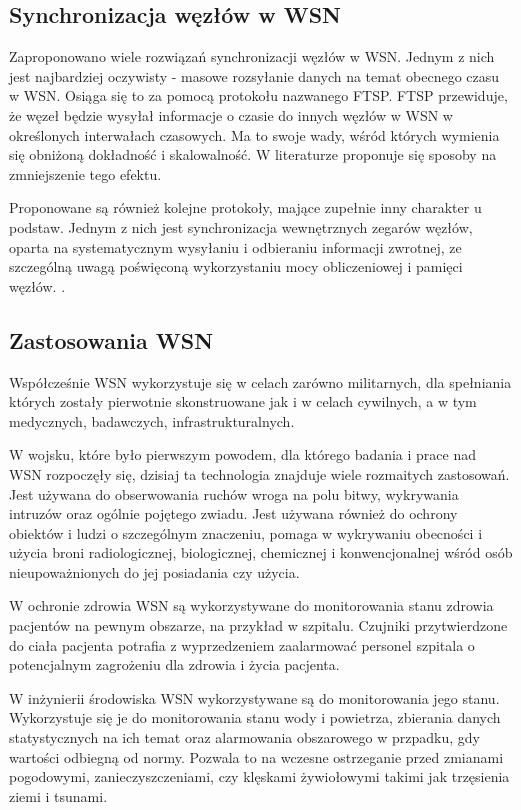 \documentclass[12pt,oneside,a4paper]{book}
\theoremstyle{break}
\begin{document}
\subsection{Synchronizacja węzłów w WSN}
Zaproponowano wiele rozwiązań synchronizacji węzłów w WSN. Jednym z nich jest 
najbardziej oczywisty - masowe rozsyłanie danych na temat obecnego czasu w WSN. 
Osiąga się to za pomocą protokołu nazwanego FTSP. FTSP przewiduje, że węzeł 
będzie wysyłał informacje o czasie do innych węzłów w WSN w określonych
interwałach czasowych. Ma to
swoje wady, wśród których wymienia się obniżoną dokładność i
skalowalność. W literaturze proponuje się
sposoby na zmniejszenie tego efektu. 
\cite{time-synchronization-based-on-slow-flooding}
\par Proponowane są również kolejne protokoły, mające zupełnie 
inny charakter u podstaw. 
Jednym z nich jest synchronizacja wewnętrznych zegarów węzłów, 
oparta na systematycznym
wysyłaniu i odbieraniu informacji zwrotnej, ze szczególną uwagą 
poświęconą wykorzystaniu
mocy obliczeniowej i pamięci węzłów.
\cite{efficient-time-synchronization}.

\subsection{Zastosowania WSN}
Współcześnie WSN wykorzystuje się w celach zarówno militarnych, dla
spełniania których zostały pierwotnie skonstruowane jak i w celach
cywilnych, a w 
tym medycznych, badawczych, infrastrukturalnych.  \cite{encyclopedia-wsn-usages}
\par W wojsku, które było pierwszym powodem, dla którego badania i prace nad WSN
rozpoczęły się, dzisiaj ta technologia znajduje wiele rozmaitych zastosowań. Jest używana
do obserwowania ruchów wroga na polu bitwy, wykrywania intruzów oraz
ogólnie pojętego zwiadu. 
Jest używana również do ochrony obiektów i ludzi o
szczególnym znaczeniu, pomaga w wykrywaniu obecności i użycia
broni radiologicznej, biologicznej, chemicznej i konwencjonalnej
wśród osób nieupoważnionych
do jej posiadania czy użycia. \cite{wsn-military-applications}
\par W ochronie zdrowia WSN są wykorzystywane do monitorowania stanu zdrowia pacjentów 
na pewnym obszarze, na przykład w szpitalu. Czujniki przytwierdzone do ciała pacjenta
potrafia z wyprzedzeniem zaalarmować personel szpitala o potencjalnym zagrożeniu dla
zdrowia i życia pacjenta. \cite{wsn-health-applications}
\par W inżynierii środowiska WSN wykorzystywane są do monitorowania jego stanu. 
Wykorzystuje się je do monitorowania stanu wody i powietrza, zbierania danych statystycznych
na ich temat oraz alarmowania obszarowego w przpadku, gdy wartości odbiegną od normy. Pozwala
to na wczesne ostrzeganie przed zmianami pogodowymi, zanieczyszczeniami, 
czy klęskami żywiołowymi takimi jak trzęsienia ziemi i tsunami. 
\cite{wsn-environmental-monitoring}
\end{document}

